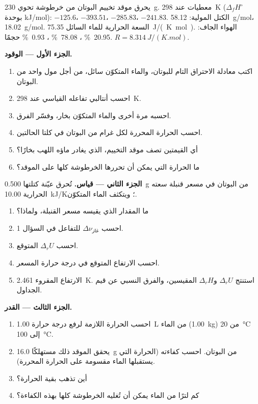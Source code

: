 \begin{problem}
\label{pb:b2:reaction-enthalpy:1}
يحرق موقد تخييم البوتان من خرطوشة تحوي \qty{230}{g}. معطيات عند
\qty{298}{K} ($\Delta_f H^\circ$ بوحدة \unit{kJ/mol}): 
$-125.6$،  $-393.51$،  $-285.83$، 
$-241.83$. الكتل المولية:  \qty{58.12}{g/mol}، 
\qty{18.02}{g/mol}. السعة الحرارية للماء السائل
\qty{75.35}{J/(K.mol)}. الهواء الجاف: \qty{20.95}{\percent} ،
\qty{78.08}{\percent} ، \qty{0.93}{\percent}  حجمًا. $R = \qty{8.314}{J/(K.mol)}$.

\medskip
\noindent\textbf{الجزء الأول --- الوقود.}
\begin{enumerate}
  \item اكتب معادلة الاحتراق التام للبوتان، والماء المتكوّن سائل، من أجل
        مول واحد من البوتان.
  \item احسب أنتالبي تفاعله القياسي عند \qty{298}{K}.
  \item احسبه مرة أخرى والماء المتكوّن بخار، وفسّر الفرق.
  \item احسب الحرارة المحررة لكل غرام من البوتان في كلتا الحالتين.
  \item أي القيمتين تصف موقد التخييم، الذي يغادر ماؤه اللهب بخارًا؟
  \item ما الحرارة التي يمكن أن تحررها الخرطوشة كلها على الموقد؟
\end{enumerate}

\medskip
\noindent\textbf{الجزء الثاني --- قياس.}
تُحرق عيّنة كتلتها \qty{0.500}{g} من البوتان في مسعر قنبلة سعته الحرارية
\qty{10.00}{kJ/K}؛ ويتكثف الماء المتكوّن.
\begin{enumerate}[resume]
  \item ما المقدار الذي يقيسه مسعر القنبلة، ولماذا؟
  \item احسب $\Delta\nu_{\text{غاز}}$ للتفاعل في السؤال 1.
  \item احسب $\Delta_r U$ المتوقع.
  \item احسب الارتفاع المتوقع في درجة حرارة المسعر.
  \item الارتفاع المقروء \qty{2.461}{K}. استنتج $\Delta_r U$
        و$\Delta_r H$ المقيسين، والفرق النسبي عن قيم الجداول.
\end{enumerate}

\medskip
\noindent\textbf{الجزء الثالث --- القدر.}
\begin{enumerate}[resume]
  \item احسب الحرارة اللازمة لرفع درجة حرارة \qty{1.00}{L} من الماء
        (\qty{1.00}{kg}) من \qty{20}{\celsius} إلى \qty{100}{\celsius}.
  \item يحقق الموقد ذلك مستهلكًا \qty{16.0}{g} من البوتان. احسب كفاءته
        (الحرارة التي يستقبلها الماء مقسومة على الحرارة المحررة).
  \item أين تذهب بقية الحرارة؟
  \item كم لترًا من الماء يمكن أن تُغليه الخرطوشة كلها بهذه الكفاءة؟
\end{enumerate}


\end{problem}
